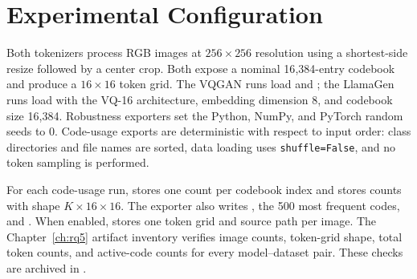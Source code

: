 \section{Experimental Configuration}
\label{sec:appendix_reproducibility}

Both tokenizers process RGB images at $256\times256$ resolution using a
shortest-side resize followed by a center crop. Both expose a nominal
16{,}384-entry codebook and produce a $16\times16$ token grid. The VQGAN runs
load  and
; the LlamaGen runs load
 with the VQ-16 architecture, embedding
dimension 8, and codebook size 16{,}384. Robustness exporters set the Python,
NumPy, and PyTorch random seeds to 0. Code-usage exports are deterministic with
respect to input order: class directories and file names are sorted, data
loading uses \texttt{shuffle=False}, and no token sampling is performed.

For each code-usage run,  stores one count per
codebook index and  stores counts with shape
$K\times16\times16$. The exporter also writes , the 500 most
frequent codes, and . When enabled,
 stores one token grid and source path per image. The
Chapter~\ref{ch:rq5} artifact inventory verifies image counts, token-grid shape,
total token counts, and active-code counts for every model--dataset pair. These
checks are archived in .

